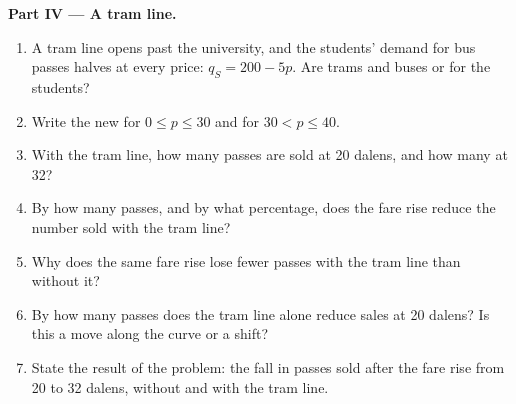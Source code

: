 \begin{problem}
\medskip
\noindent\textbf{Part IV --- A tram line.}
\begin{enumerate}[resume]
\item A tram line opens past the university, and the students' demand for bus passes halves at every price: $q_S = 200 - 5p$.
  Are trams and buses  or  for the students?
\item Write the new  for $0 \le p \le 30$ and for $30 < p \le 40$.
\item With the tram line, how many passes are sold at 20 dalens, and how many at 32?
\item By how many passes, and by what percentage, does the fare rise reduce the number sold with the tram line?
\item Why does the same fare rise lose fewer passes with the tram line than without it?
\item By how many passes does the tram line alone reduce sales at 20 dalens? Is this a move along the curve or a shift?
\item State the result of the problem: the fall in passes sold after the fare rise from 20 to 32 dalens, without and with the
  tram line.
\end{enumerate}
\end{problem}
